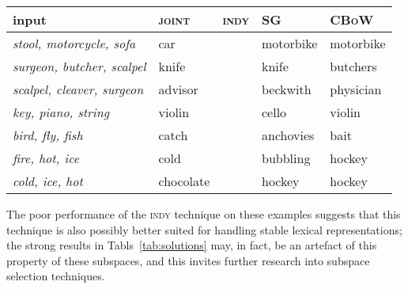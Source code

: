 \begin{table}
\centering
\begin{tabular}{l|llll}
\hline
input & \textsc{joint} & \textsc{indy} & \textsc{SG} & \textsc{CBoW} \\
\hline
\emph{stool, motorcycle, sofa} & car & & motorbike & motorbike \\
\emph{surgeon, butcher, scalpel} & knife & & knife & butchers \\
\emph{scalpel, cleaver, surgeon} & advisor & & beckwith & physician \\
\emph{key, piano, string} & violin & & cello & violin \\
\emph{bird, fly, fish} & catch & & anchovies & bait \\
\emph{fire, hot, ice} & cold & & bubbling & hockey \\
\emph{cold, ice, hot} & chocolate & & hockey & hockey \\
\hline
\end{tabular}
\end{table}

The poor performance of the \textsc{indy} technique on these examples suggests that this technique is also possibly better suited for handling stable lexical representations; the strong results in Tabls~\ref{tab:solutions} may, in fact, be an artefact of this property of these subspaces, and this invites further research into subspace selection techniques.

